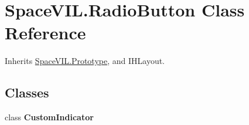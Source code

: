 \hypertarget{class_space_v_i_l_1_1_radio_button}{}\section{Space\+V\+I\+L.\+Radio\+Button Class Reference}
\label{class_space_v_i_l_1_1_radio_button}


Inherits \mbox{\hyperlink{class_space_v_i_l_1_1_prototype}{Space\+V\+I\+L.\+Prototype}}, and I\+H\+Layout.

\subsection*{Classes}
\begin{DoxyCompactItemize}
\item 
class {\bfseries Custom\+Indicator}
\end{DoxyCompactItemize}
